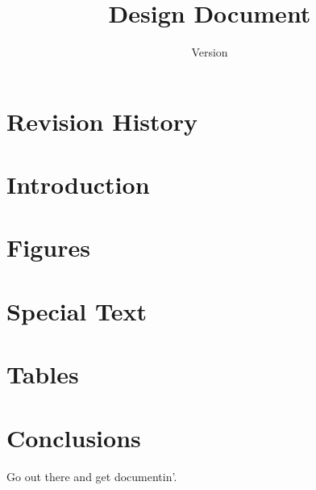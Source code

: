 \documentclass[12pt]{article}
\title{\projname{} Design Document}
\author{Version \version}
\begin{document}
	\pagestyle{firststyle}
	
	\newpage
	\section{Revision History}
	
	\newpage
	\tableofcontents	
	\newpage
	\listoffigures
	\newpage
	\listoftables	
	\pagestyle{bodystyle}
	
	\newpage
	\section{Introduction}
	\label{sec:intro}
	
	
	\newpage
	\section{Figures}
	\label{sec:figures}
	
	
	\newpage
	\section{Special Text}
	\label{sec:special_text}
	
	
	\newpage
	\section{Tables}
	\label{sec:tables}
	
	
	\section{Conclusions}
	Go out there and get documentin'.
	
\end{document}
